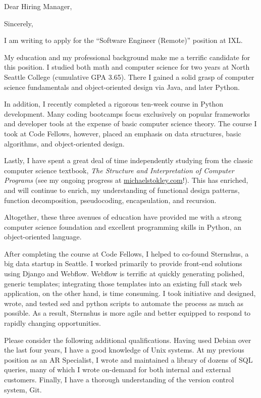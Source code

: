 \documentclass[10pt,a4paper,sans]{moderncv}        %
\begin{document}
\date{\today{}}
\opening{Dear Hiring Manager,}
\closing{Sincerely,}
\makelettertitle

I am writing to apply for the ``Software Engineer (Remote)'' position at IXL.

My education and my professional background make me a terrific candidate for
this position. I studied both math and computer science for two years at North
Seattle College (cumulative GPA 3.65). There I gained a solid grasp of computer
science fundamentals and object-oriented design via Java, and later Python.

In addition, I recently completed a rigorous ten-week course in Python
development. Many coding bootcamps focus exclusively on popular frameworks and
developer tools at the expense of basic computer science theory. The course I
took at Code Fellows, however, placed an emphasis on data structures, basic
algorithms, and object-oriented design.

Lastly, I have spent a great deal of time independently studying from the
classic computer science textbook, \textit{The Structure and Interpretation of
  Computer Programs} (see my ongoing progress at
{\href{http://michaelstokley.com}{michaelstokley.com}}!). This has enriched, and
will continue to enrich, my understanding of functional design patterns,
function decomposition, pseudocoding, encapsulation, and recursion.

Altogether, these three avenues of education have provided me with a strong
computer science foundation and excellent programming skills in Python, an
object-oriented language.

After completing the course at Code Fellows, I helped to co-found Sternshus, a
big data startup in Seattle. I worked primarily to provide front-end solutions
using Django and Webflow. Webflow is terrific at quickly generating polished,
generic templates; integrating those templates into an existing full stack web
application, on the other hand, is time consuming. I took initiative and
designed, wrote, and tested sed and python scripts to automate the process as
much as possible. As a result, Sternshus is more agile and better equipped to
respond to rapidly changing opportunities.

Please consider the following additional qualifications. Having used Debian over
the last four years, I have a good knowledge of Unix systems. At my previous
position as an AR Specialist, I wrote and maintained a library of dozens of SQL
queries, many of which I wrote on-demand for both internal and external
customers. Finally, I have a thorough understanding of the version control
system, Git.
\end{document}
